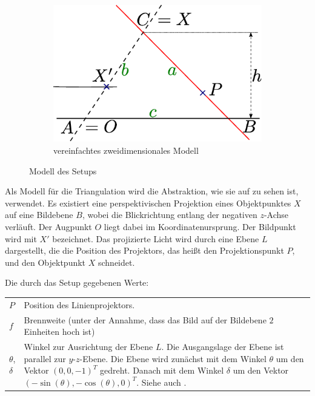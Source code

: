 \documentclass[ngerman,a4paper,parskip=half]{scrartcl}
\begin{document}
\begin{figure}
	\begin{subfigure}{0.45\textwidth}
		\includegraphics[width=\textwidth]{includes/triangulation2d}
		\caption{vereinfachtes zweidimensionales Modell}
		\label{fig:triangulation2d}
	\end{subfigure}
	\caption{Modell des Setups}
\end{figure}

Als Modell für die Triangulation wird die Abstraktion, wie sie auf  zu sehen ist, verwendet. Es existiert eine perspektivischen Projektion eines Objektpunktes $X$ auf eine Bildebene $B$, wobei die Blickrichtung entlang der negativen $z$-Achse verläuft. Der Augpunkt $O$ liegt dabei im Koordinatenursprung. Der Bildpunkt wird mit $X'$ bezeichnet. Das projizierte Licht wird durch eine Ebene $L$ dargestellt, die die Position des Projektors, das heißt den Projektionspunkt $P$, und den Objektpunkt $X$ schneidet.

Die durch das Setup gegebenen Werte:

\begin{tabular}{lp{12cm}}
	$P$                &
		Position des Linienprojektors.\\[0.5em]
	$f$                &
		Brennweite
		(unter der Annahme, dass das Bild auf der Bildebene $2$ Einheiten hoch ist)\\[0.5em]
	$\theta$,$\delta$  &
		Winkel zur Ausrichtung der Ebene $L$. Die Ausgangslage der Ebene ist parallel zur $y$-$z$-Ebene. Die Ebene wird zunächst mit dem Winkel $\theta$ um den Vektor {\color{red} $(0,0,-1)^T$} gedreht. Danach mit dem Winkel $\delta$ um den Vektor {\color{red} $(-\sin(\theta), -\cos(\theta), 0)^T$}. Siehe auch \Fref{fig:triangulation_skew_pitch}.
\end{tabular}
\end{document}
